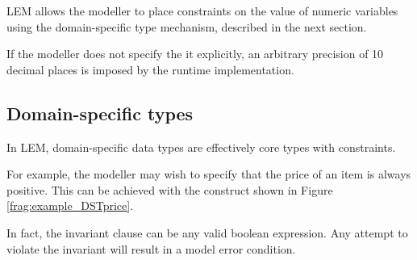 LEM allows the modeller to place constraints on the value of numeric variables
using the domain-specific type mechanism, described in the next section.


If the modeller does not specify the it explicitly, an arbitrary
precision of 10 decimal places is imposed by the runtime implementation.

\subsection{Domain-specific types}

In LEM, domain-specific data types are effectively core types with constraints.

For example, the modeller may wish to specify that the price of an item is always
positive. This can be achieved with the construct shown in Figure
\ref{frag:example_DSTprice}.


In fact, the invariant clause can be any valid boolean expression. Any attempt
to violate the invariant will result in a \textsf{model error condition}.

